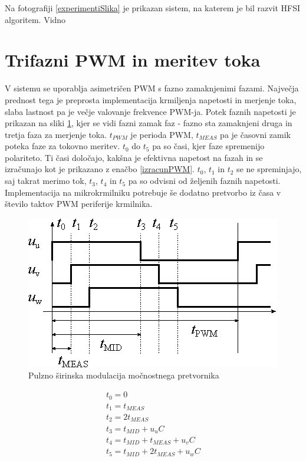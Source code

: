 \documentclass[a4paper,twoside,openright,12pt,slovene]{book}
\begin{document}
Na fotografiji \ref{experimentiSlika} je prikazan sistem, na katerem je bil razvit HFSI algoritem. Vidno

\section{Trifazni PWM in meritev toka}

V sistemu se uporablja asimetričen PWM s fazno zamaknjenimi fazami. Največja prednost tega je preprosta implementacija krmiljenja napetosti in merjenje toka, slaba lastnost pa je večje valovanje
frekvence PWM-ja. Potek faznih napetosti je prikazan na sliki \ref{PWM}, kjer se vidi fazni zamak faz - fazno sta zamaknjeni druga in tretja faza za merjenje toka. $t_{PWM}$ je perioda PWM, $t_{MEAS}$
pa je časovni zamik poteka faze za tokovno meritev. $t_0$ do $t_5$ pa so časi, kjer faze spremenijo polariteto. Ti časi določajo, kakšna je efektivna napetost na fazah in se izračunajo kot je
prikazano z enačbo \ref{izracunPWM}. $t_0$, $t_1$ in $t_2$ se ne spreminjajo, saj takrat merimo tok, $t_3$, $t_4$ in $t_5$ pa so odvisni od željenih faznih napetosti. Implementacija na mikrokrmilniku
potrebuje še dodatno pretvorbo iz časa v število taktov PWM periferije krmilnika.

\begin{figure}[!htbp]
    \centering
    \includegraphics[width=1\columnwidth]{Slike/Inkscape/PWM.eps}
    \caption{\label{PWM} Pulzno širinska modulacija močnostnega pretvornika }
\end{figure}

\begin{equation} \label{izracunPWM}
\begin{gathered}
    t_0 = 0  \\
    t_1 = t_{MEAS}  \\
    t_2 = 2t_{MEAS}  \\
    t_3 = t_{MID} + u_uC  \\
    t_4 = t_{MID} + t_{MEAS} + u_vC \\
    t_5 = t_{MID} + 2t_{MEAS} + u_wC
\end{gathered}
\end{equation}
\end{document}
